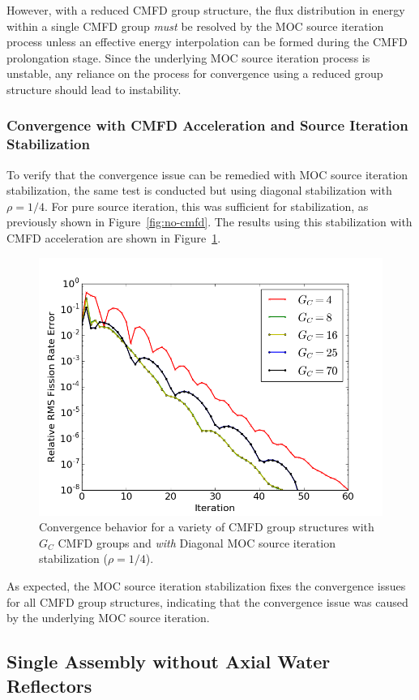 However, with a reduced \ac{CMFD} group structure, the flux distribution in energy within a single \ac{CMFD} group \textit{must} be resolved by the \ac{MOC} source iteration process unless an effective energy interpolation can be formed during the \ac{CMFD} prolongation stage. Since the underlying \ac{MOC} source iteration process is unstable, any reliance on the process for convergence using a reduced group structure should lead to instability.

\subsubsection{Convergence with CMFD Acceleration and Source Iteration Stabilization}

To verify that the convergence issue can be remedied with \ac{MOC} source iteration stabilization, the same test is conducted but using diagonal stabilization with $\rho = 1/4$. For pure source iteration, this was sufficient for stabilization, as previously shown in Figure~\ref{fig:no-cmfd}. The results using this stabilization with \ac{CMFD} acceleration are shown in Figure~\ref{fig:sa-cmfd-stab}. 
\begin{figure}[ht!]
	\centering
	\includegraphics[width=0.65\linewidth]{figures/convergence/sa_stab_cmfd.png}
	\caption{Convergence behavior for a variety of \ac{CMFD} group structures with $G_C$ \ac{CMFD} groups and \textit{with} Diagonal \ac{MOC} source iteration stabilization ($\rho = 1/4$).}
	\label{fig:sa-cmfd-stab}
\end{figure}
As expected, the \ac{MOC} source iteration stabilization fixes the convergence issues for all \ac{CMFD} group structures, indicating that the convergence issue was caused by the underlying \ac{MOC} source iteration.

\subsection{Single Assembly without Axial Water Reflectors}
\label{sec:sa-no-axial-ref}

